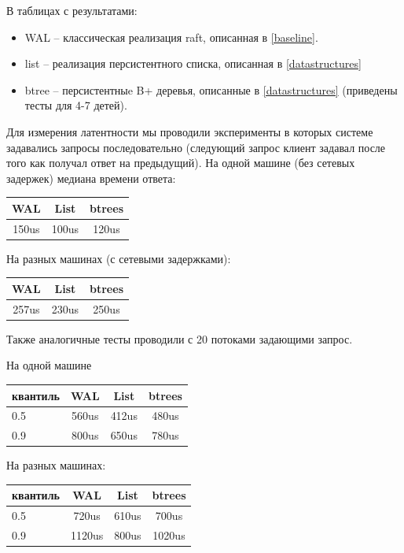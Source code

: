 \documentclass[pdftex,ptm,12pt,a4paper]{report}
\theoremstyle{definition}
\begin{document}
В таблицах с результатами:
\begin{itemize}
    \item WAL -- классическая реализация raft, описанная в \ref{baseline}.
    \item list -- реализация персистентного списка, описанная в \ref{datastructures}
    \item btree -- персистентныe B+ деревья, описанные в \ref{datastructures} (приведены тесты для 4-7 детей).
\end{itemize}

Для измерения латентности мы проводили эксперименты в которых системе задавались запросы последовательно
(следующий запрос клиент задавал  после того как получал ответ на предыдущий).
На одной машине (без сетевых задержек) медиана времени ответа:
\begin{center}
\begin{tabular} {|c c c|}
\hline
    WAL & List & btrees \\
    \hline
150us & 100us & 120us \\
\hline
\end{tabular}
\end{center}

На разных машинах (с сетевыми задержками):
\begin{center}
\begin{tabular} {|c c c|}
\hline
    WAL & List & btrees \\
    \hline
257us & 230us & 250us \\
\hline
\end{tabular}
\end{center}

Также аналогичные тесты проводили с 20 потоками задающими запрос.

На одной машине

\begin{center}
\begin{tabular} {|l |c c c|}
\hline
квантиль & WAL & List & btrees \\
\hline
0.5 & 560us & 412us & 480us \\
0.9 & 800us & 650us & 780us \\
\hline
\end{tabular}
\end{center}

На разных машинах:

\begin{center}
\begin{tabular} {|l |c c c|}
\hline
квантиль & WAL & List & btrees \\
\hline
0.5 & 720us & 610us & 700us \\
0.9 & 1120us & 800us & 1020us \\
\hline
\end{tabular}
\end{center}
\end{document}
